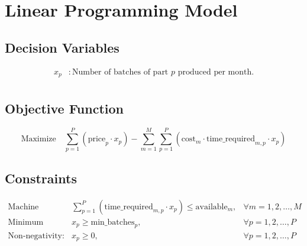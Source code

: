 \documentclass{article}
\begin{document}
\section*{Linear Programming Model}

\subsection*{Decision Variables}
\begin{align*}
x_p & : \text{Number of batches of part } p \text{ produced per month.} \\
\end{align*}

\subsection*{Objective Function}
\[
\text{Maximize} \quad \sum_{p=1}^{P} (\text{price}_{p} \cdot x_p) - \sum_{m=1}^{M} \sum_{p=1}^{P} (\text{cost}_{m} \cdot \text{time\_required}_{m,p} \cdot x_p)
\]

\subsection*{Constraints}
\begin{align*}
\text{Machine Availability:} \quad & \sum_{p=1}^{P} (\text{time\_required}_{m,p} \cdot x_p) \leq \text{available}_{m}, & \forall m = 1, 2, \ldots, M \\
\text{Minimum Batch Requirement:} \quad & x_p \geq \text{min\_batches}_{p}, & \forall p = 1, 2, \ldots, P \\
\text{Non-negativity:} \quad & x_p \geq 0, & \forall p = 1, 2, \ldots, P
\end{align*}
\end{document}
